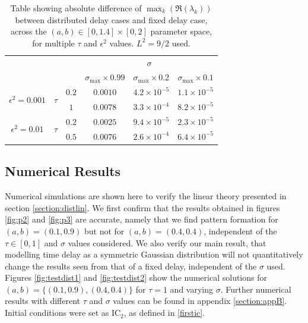 \begin{table}[H]
\centering
\begin{tabular}{|c|c|c|c|c|c|}
\hline
\multicolumn{3}{|c|}{\multirow{2}{*}{}}                                                 & \multicolumn{3}{c|}{\textbf{$\sigma$}}                                                                     \\ \cline{4-6}
\multicolumn{3}{|c|}{}                                                                  & $\sigma_{\max}\times0.99$ & \textbf{$\sigma_{\max}\times0.2$} & \textbf{$\sigma_{\max}\times0.1$} \\ \hline
\multirow{2}{*}{$\epsilon^2=0.001$} & \multirow{2}{*}{\textbf{$\tau$}} & \textbf{$0.2$} & $0.0010$                           & $4.2\times10^{-5}$                & $1.1\times10^{-5}$                \\ \cline{3-6}
                                    &                                  & \textbf{$1$}   & $0.0078$                           & $3.3\times10^{-4}$                & $8.2\times10^{-5}$                \\ \hline
\multirow{2}{*}{$\epsilon^2=0.01$}  & \multirow{2}{*}{\textbf{$\tau$}} & \textbf{$0.2$} & $0.0025$                           & $9.4\times10^{-5}$                & $2.3\times10^{-5}$                \\ \cline{3-6}
                                    &                                  & $0.5$          & \textbf{$0.0076$}                  & $2.6\times10^{-4}$                & $6.4\times10^{-5}$               \\ \hline
\end{tabular}
\caption{Table showing absolute difference of $\max_k(\Re(\lambda_k))$ between distributed delay cases and fixed delay case, across the $(a,b)\in[0,1.4]\times[0,2]$ parameter space, for multiple $\tau$ and $\epsilon^2$ values. $L^2=9/2$ used.}
\label{tab:tab1}
\end{table}

\subsection{Numerical Results}\label{section:distsim}
Numerical simulations are shown here to verify the linear theory presented in section \ref{section:distlin}. We first confirm that the results obtained in figures \ref{fig:p2} and \ref{fig:p3} are accurate, namely that we find pattern formation for $(a,b)=(0.1,0.9)$ but not for $(a,b)=(0.4,0.4)$, independent of the $\tau\in[0,1]$ and $\sigma$ values considered. We also verify our main result, that modelling time delay as a symmetric Gaussian distribution will not quantitatively change the results seen from that of a fixed delay, independent of the $\sigma$ used. Figures \ref{fig:testdist1} and \ref{fig:testdist2} show the numerical solutions for $(a,b)=\{(0.1,0.9),(0.4,0.4)\}$ for $\tau=1$ and varying $\sigma$. Further numerical results with different $\tau$ and $\sigma$ values can be found in appendix \ref{section:appB}. Initial conditions were set as $\text{IC}_2$, as defined in \eqref{firstic}.

